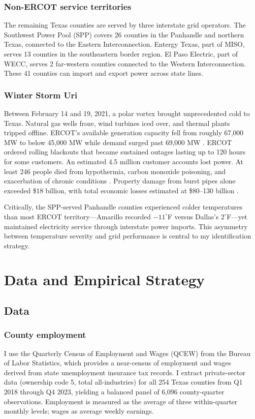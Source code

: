 \documentclass[12pt]{article}
\begin{document}
\subsubsection*{Non-ERCOT service territories} The remaining Texas counties are served by three interstate grid operators. The Southwest Power Pool (SPP) covers 26 counties in the Panhandle and northern Texas, connected to the Eastern Interconnection. Entergy Texas, part of MISO, serves 13 counties in the southeastern border region. El Paso Electric, part of WECC, serves 2 far-western counties connected to the Western Interconnection. These 41 counties can import and export power across state lines.

\subsubsection*{Winter Storm Uri} Between February 14 and 19, 2021, a polar vortex brought unprecedented cold to Texas. Natural gas wells froze, wind turbines iced over, and thermal plants tripped offline. ERCOT's available generation capacity fell from roughly 67,000 MW to below 45,000 MW while demand surged past 69,000 MW \citep{busby2021cascading}. ERCOT ordered rolling blackouts that became sustained outages lasting up to 120 hours for some customers. An estimated 4.5 million customer accounts lost power. At least 246 people died from hypothermia, carbon monoxide poisoning, and exacerbation of chronic conditions \citep{almeida2021uri}. Property damage from burst pipes alone exceeded \$18 billion, with total economic losses estimated at \$80--130 billion \citep{doss-gollin2021}.

Critically, the SPP-served Panhandle counties experienced colder temperatures than most ERCOT territory---Amarillo recorded $-11^{\circ}$F versus Dallas's $2^{\circ}$F---yet maintained electricity service through interstate power imports. This asymmetry between temperature severity and grid performance is central to my identification strategy.


\section{Data and Empirical Strategy}

\subsection{Data}

\subsubsection*{County employment} I use the Quarterly Census of Employment and Wages (QCEW) from the Bureau of Labor Statistics, which provides a near-census of employment and wages derived from state unemployment insurance tax records. I extract private-sector data (ownership code 5, total all-industries) for all 254 Texas counties from Q1 2018 through Q4 2023, yielding a balanced panel of 6,096 county-quarter observations. Employment is measured as the average of three within-quarter monthly levels; wages as average weekly earnings.
\end{document}
